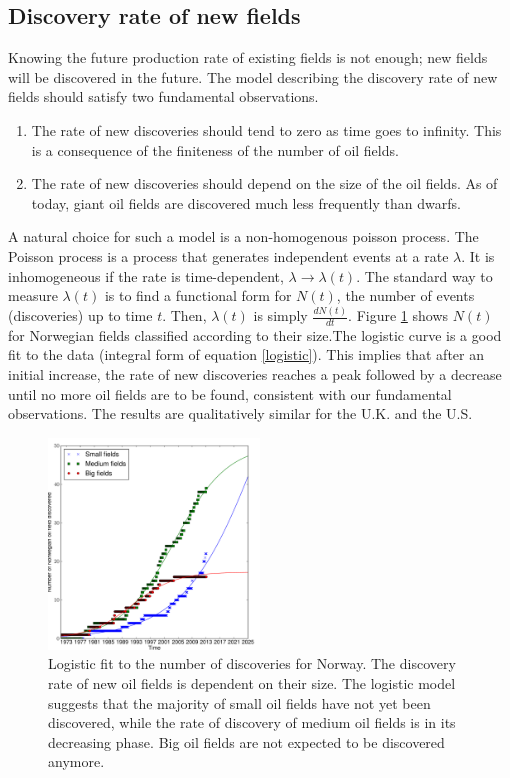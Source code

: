 \documentclass[twoside]{article}
\begin{document}
\begin{multicols}{2}
\subsection{Discovery rate of new fields}
Knowing the future production rate of existing fields is not enough; new fields will be discovered in the future. The model describing the discovery rate of new fields should satisfy two fundamental observations. 

\begin{enumerate}
\item The rate of new discoveries should tend to zero as time goes to infinity. This is a consequence of the finiteness of the number of oil fields. 
\item The rate of new discoveries should depend on the size of the oil fields. As of today, giant oil fields are discovered much less frequently than dwarfs.
\end{enumerate}

A natural choice for such a model is a non-homogenous poisson process. The Poisson process is a process that generates independent events at  a rate $\lambda$. It is inhomogeneous if the rate is time-dependent, $\lambda \rightarrow \lambda(t)$. The standard way to measure $\lambda(t)$ is to find a functional form for $N(t)$, the number of events (discoveries) up to time $t$. Then, $\lambda(t)$ is simply $\frac{dN(t)}{dt}$. Figure \ref{rate_of_discovery} shows $N(t)$ for Norwegian fields classified according to their size.The logistic curve is a good fit to the data (integral form of equation \ref{logistic}). This implies that after an initial increase, the rate of new discoveries reaches a peak followed by a decrease until no more oil fields are to be found, consistent with our fundamental observations. The results are qualitatively similar for the U.K. and the U.S.

\begin{figure}[H]
    \includegraphics[width=0.5\textwidth]{rate_of_discoveries.pdf}
    \caption{Logistic fit to the number of discoveries for Norway. The discovery rate of new oil fields is dependent on their size. The logistic model suggests that the majority of small oil  fields have not yet been discovered, while the rate of discovery of medium oil fields is in its decreasing phase. Big oil fields are not expected to be discovered anymore. }
    \label{rate_of_discovery}
\end{figure}



\end{multicols}
\end{document}

